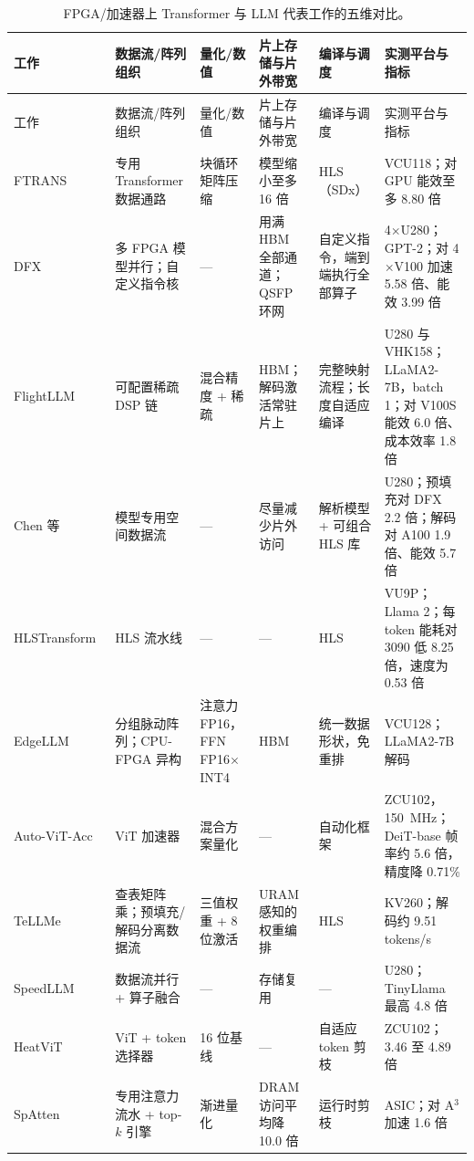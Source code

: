 \documentclass[a4paper,10.5pt]{ctexart}
\begin{document}
\begin{small}
\begin{longtable}{p{1.6cm} p{2.4cm} p{2.1cm} p{2.2cm} p{2.2cm} p{2.8cm}}
\caption{FPGA/加速器上 Transformer 与 LLM 代表工作的五维对比。}\label{tab:compare}\\
\toprule
工作 & 数据流/阵列组织 & 量化/数值 & 片上存储与片外带宽 & 编译与调度 & 实测平台与指标 \\
\midrule
\endfirsthead
\toprule
工作 & 数据流/阵列组织 & 量化/数值 & 片上存储与片外带宽 & 编译与调度 & 实测平台与指标 \\
\midrule
\endhead
\bottomrule
\endfoot
FTRANS~\cite{ftrans} & 专用 Transformer 数据通路 & 块循环矩阵压缩 & 模型缩小至多 16 倍 & HLS（SDx） & VCU118；对 GPU 能效至多 8.80 倍 \\
DFX~\cite{dfx} & 多 FPGA 模型并行；自定义指令核 & — & 用满 HBM 全部通道；QSFP 环网 & 自定义指令，端到端执行全部算子 & 4$\times$U280；GPT-2；对 4$\times$V100 加速 5.58 倍、能效 3.99 倍 \\
FlightLLM~\cite{flightllm} & 可配置稀疏 DSP 链 & 混合精度 + 稀疏 & HBM；解码激活常驻片上 & 完整映射流程；长度自适应编译 & U280 与 VHK158；LLaMA2-7B，batch 1；对 V100S 能效 6.0 倍、成本效率 1.8 倍 \\
Chen 等~\cite{chen2024trets} & 模型专用空间数据流 & — & 尽量减少片外访问 & 解析模型 + 可组合 HLS 库 & U280；预填充对 DFX 2.2 倍；解码对 A100 1.9 倍、能效 5.7 倍 \\
HLSTransform~\cite{hlstransform} & HLS 流水线 & — & — & HLS & VU9P；Llama 2；每 token 能耗对 3090 低 8.25 倍，速度为 0.53 倍 \\
EdgeLLM~\cite{edgellm} & 分组脉动阵列；CPU-FPGA 异构 & 注意力 FP16，FFN FP16$\times$INT4 & HBM & 统一数据形状，免重排 & VCU128；LLaMA2-7B 解码 \\
Auto-ViT-Acc~\cite{autovitacc} & ViT 加速器 & 混合方案量化 & — & 自动化框架 & ZCU102，150~MHz；DeiT-base 帧率约 5.6 倍，精度降 0.71\% \\
TeLLMe~\cite{tellme} & 查表矩阵乘；预填充/解码分离数据流 & 三值权重 + 8 位激活 & URAM 感知的权重编排 & HLS & KV260；解码约 9.51 tokens/s \\
SpeedLLM~\cite{speedllm} & 数据流并行 + 算子融合 & — & 存储复用 & — & U280；TinyLlama 最高 4.8 倍 \\
HeatViT~\cite{heatvit} & ViT + token 选择器 & 16 位基线 & — & 自适应 token 剪枝 & ZCU102；3.46 至 4.89 倍 \\
SpAtten~\cite{spatten} & 专用注意力流水 + top-$k$ 引擎 & 渐进量化 & DRAM 访问平均降 10.0 倍 & 运行时剪枝 & ASIC；对 A$^3$ 加速 1.6 倍 \\

\end{longtable}
\end{small}
\end{document}
